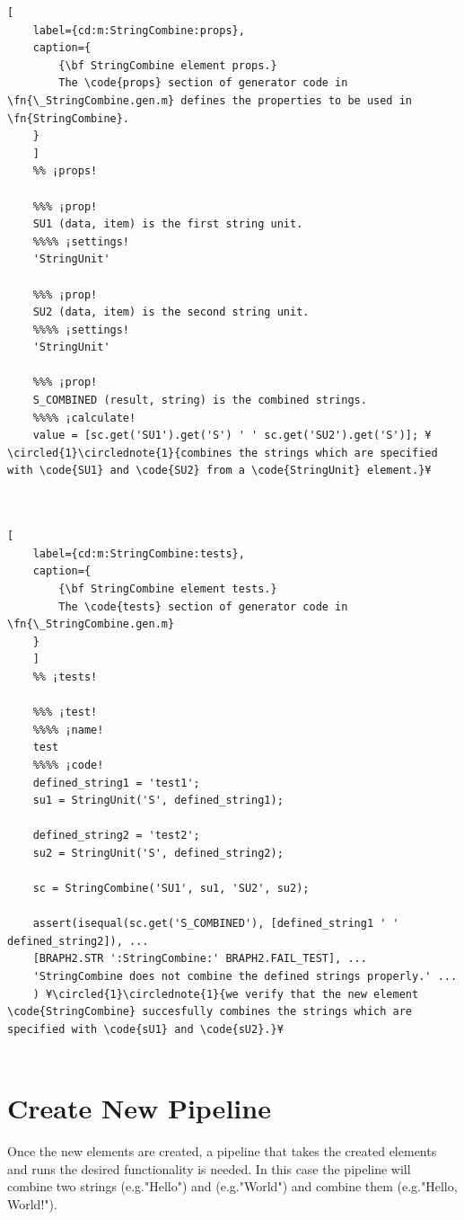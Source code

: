 \documentclass{tufte-handout}
\begin{document}
\begin{lstlisting}[
	label={cd:m:StringCombine:props},
	caption={
		{\bf StringCombine element props.}
		The \code{props} section of generator code in \fn{\_StringCombine.gen.m} defines the properties to be used in \fn{StringCombine}.
	}
	]
	%% ¡props!
	
	%%% ¡prop!
	SU1 (data, item) is the first string unit.
	%%%% ¡settings!
	'StringUnit'
	
	%%% ¡prop!
	SU2 (data, item) is the second string unit.
	%%%% ¡settings!
	'StringUnit'
	
	%%% ¡prop!
	S_COMBINED (result, string) is the combined strings.
	%%%% ¡calculate!
	value = [sc.get('SU1').get('S') ' ' sc.get('SU2').get('S')]; ¥\circled{1}\circlednote{1}{combines the strings which are specified with \code{SU1} and \code{SU2} from a \code{StringUnit} element.}¥
	
	
\end{lstlisting}

\begin{lstlisting}[
	label={cd:m:StringCombine:tests},
	caption={
		{\bf StringCombine element tests.}
		The \code{tests} section of generator code in \fn{\_StringCombine.gen.m}
	}
	]
	%% ¡tests!
	
	%%% ¡test!
	%%%% ¡name!
	test
	%%%% ¡code!
	defined_string1 = 'test1';
	su1 = StringUnit('S', defined_string1);
	
	defined_string2 = 'test2';
	su2 = StringUnit('S', defined_string2);
	
	sc = StringCombine('SU1', su1, 'SU2', su2);
	
	assert(isequal(sc.get('S_COMBINED'), [defined_string1 ' ' defined_string2]), ...
	[BRAPH2.STR ':StringCombine:' BRAPH2.FAIL_TEST], ...
	'StringCombine does not combine the defined strings properly.' ...
	) ¥\circled{1}\circlednote{1}{we verify that the new element \code{StringCombine} succesfully combines the strings which are specified with \code{sU1} and \code{sU2}.}¥
	
\end{lstlisting}

\clearpage
\section{Create New Pipeline}

Once the new elements are created, a pipeline that takes the created elements and runs the desired functionality is needed. In this case the pipeline will combine two strings (e.g."Hello") and (e.g."World") and combine them  (e.g."Hello, World!").
\end{document}
